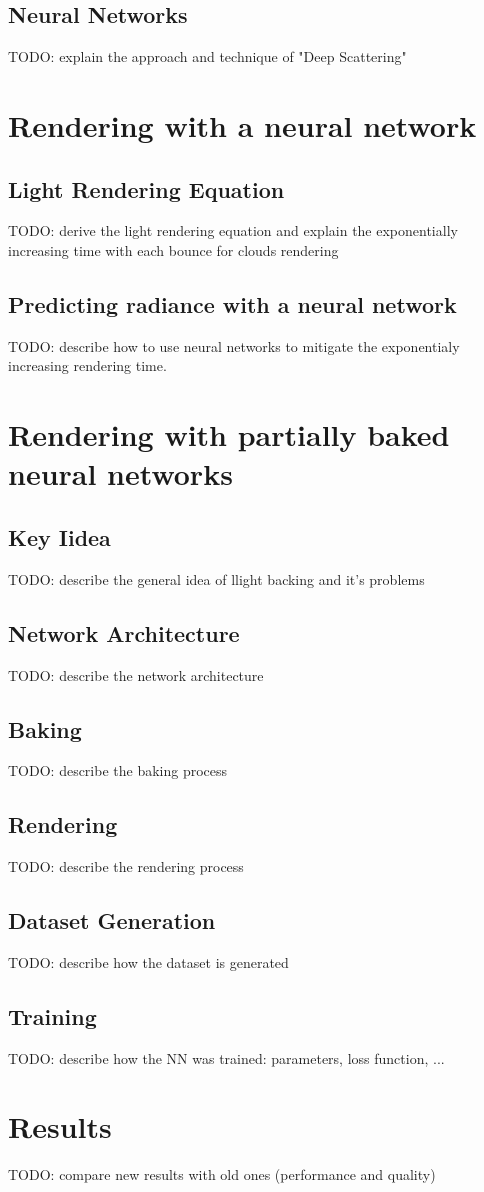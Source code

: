 \documentclass[times,specification,annotation]{itmo-student-thesis}
\begin{document}
\section{Neural Networks}\label{sec:NeuralNetworks}
TODO: explain the approach and technique of "Deep Scattering"
\finishrelatedwork

\chapter{Rendering with a neural network}
\section{Light Rendering Equation}\label{sec:LightRenderingEquation}
TODO: derive the light rendering equation and explain the exponentially increasing time with each bounce for clouds rendering
\section{Predicting radiance with a neural network}\label{sec:PredictingRadianceWithNN}
TODO: describe how to use neural networks to mitigate the exponentialy increasing rendering time.

\chapter{Rendering with partially baked neural networks}
\section{Key Iidea}\label{sec:keyIdea}
TODO: describe the general idea of llight backing and it's problems
\section{Network Architecture}\label{sec:architecture}
TODO: describe the network architecture
\section{Baking}\label{sec:baking}
TODO: describe the baking process
\section{Rendering}\label{sec:rendering}
TODO: describe the rendering process
\section{Dataset Generation}\label{sec:generation}
TODO: describe how the dataset is generated
\section{Training}\label{sec:training}
TODO: describe how the NN was trained: parameters, loss function, ...

\chapter{Results}
TODO: compare new results with old ones (performance and quality)
\end{document}
